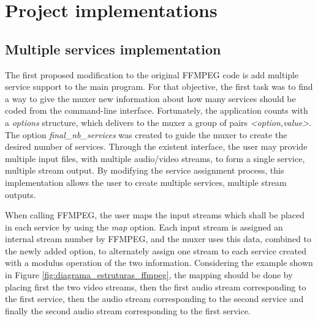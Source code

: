 \documentclass[
	12pt,				%
	openright,			%
	twoside,			%
	a4paper,			%
	brazil,
	french,				%
	english
	]{abntex2}
\begin{document}

\chapter{Project implementations}

\section{Multiple services implementation}

The first proposed modification to the original FFMPEG code is add multiple service support to the main program. For that objective, the first task was to find a way to give the muxer new information about how many services should be coded from the command-line interface. Fortunately, the application counts with a \textit{options} structure, which delivers to the muxer a group of pairs \textit{<option,value>}. The option \textit{final\_nb\_services} was created to guide the muxer to create the desired number of services. Through the existent interface, the user may provide multiple input files, with multiple audio/video streams, to form a single service, multiple stream output. By modifying the service assignment process, this implementation allows the user to create multiple services, multiple stream outputs.

When calling FFMPEG, the user maps the input streams which shall be placed in each service by using the \textit{\-map} option. Each input stream is assigned an internal stream number by FFMPEG, and the muxer uses this data, combined to the newly added option, to alternately assign one stream to each service created with a modulus operation of the two information. Considering the example shown in Figure \ref{fig:diagrama_estruturas_ffmpeg}, the mapping should be done by placing first the two video streams, then the first audio stream corresponding to the first service, then the audio stream corresponding to the second service and finally the second audio stream corresponding to the first service.
\end{document}
